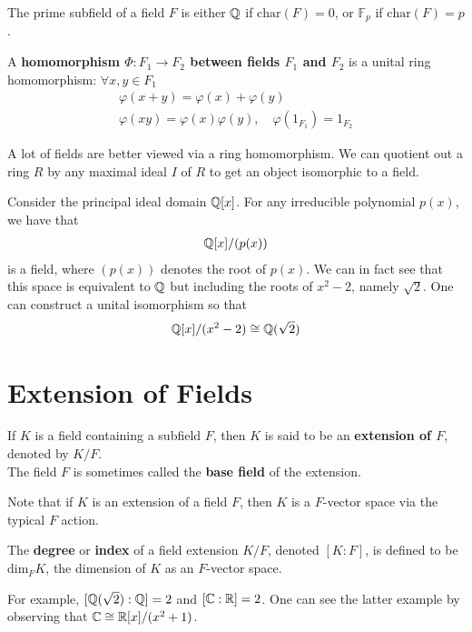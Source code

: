 \documentclass{memoir}
\begin{document}
\begin{prop}
	The prime subfield of a field \(F\) is either \(\mathbb{Q}\) if \(\textrm{char}(F) = 0\), or \(\mathbb{F}_p\) if \(\textrm{char}(F) = p\).
\end{prop}

\begin{defn}
	A \textbf{homomorphism \(\Phi:F_1\to F_2\) between fields \(F_1\) and \(F_2\)} is a unital ring homomorphism: \(\forall x,y \in F_1\)
	\begin{align*}
		\varphi (x+y) = \varphi (x) + \varphi (y)\\
		\varphi (xy) = \varphi (x) \varphi (y), \quad \varphi (1_{F_1}) = 1_{F_2}
	\end{align*}
\end{defn}

A lot of fields are better viewed via a ring homomorphism. We can quotient out a ring \(R\) by any maximal ideal \(I\) of \(R\) to get an object isomorphic to a field.
\begin{exmp}
	Consider the principal ideal domain \(\mathbb{Q}[x]\). For any irreducible polynomial \(p(x)\), we have that
	\begin{align*}
		\mathbb{Q}[x] / (p(x))
	\end{align*}
	is a field, where \((p(x))\) denotes the root of \(p(x)\). We can in fact see that this space is equivalent to \(\mathbb{Q}\) but including the roots of \(x^2-2\), namely \(\sqrt{2} \). One can construct a unital isomorphism so that
	\begin{align*}
		\mathbb{Q}[x] / (x^2-2) \cong \mathbb{Q}(\sqrt{2} )
	\end{align*}
\end{exmp}

\section{Extension of Fields}
\label{sec:extension_of_fields}

\begin{defn}
	If \(K\) is a field containing a subfield \(F\), then \(K\) is said to be an \textbf{extension of \(F\)}, denoted by \(K / F\).\\

	The field \(F\) is sometimes called the \textbf{base field} of the extension.
\end{defn}
Note that if \(K\) is an extension of a field \(F\), then \(K\) is a \(F\)-vector space via the typical \(F\) action.

\begin{defn}
	The \textbf{degree} or \textbf{index} of a field extension \(K / F\), denoted \([K:F]\), is defined to be \(\textrm{dim}_F K\), the dimension of \(K\) as an \(F\)-vector space.
\end{defn}
For example, \([\mathbb{Q}(\sqrt{2} ) : \mathbb{Q}] = 2\) and \([\mathbb{C}: \mathbb{R}] = 2\). One can see the latter example by observing that \(\mathbb{C}\cong \mathbb{R}[x] / (x^2+1)\).
\end{document}
